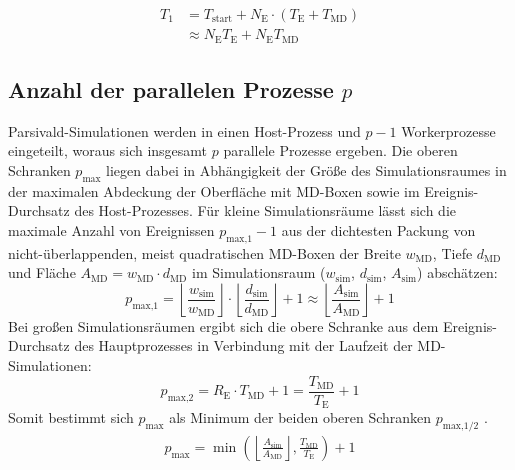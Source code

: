 \begin{align}
  T_1 & = T_\text{start} + N_\text{E} \cdot (T_\text{E} + T_\text{MD}) \\
      & \approx N_\text{E} T_\text{E} + N_\text{E} T_\text{MD}
\end{align}

\subsection{Anzahl der parallelen Prozesse \texorpdfstring{$p$}{p}}

Parsivald-Simulationen werden in einen Host-Prozess und $p-1$ Workerprozesse eingeteilt, woraus sich insgesamt $p$ parallele Prozesse ergeben.
Die oberen Schranken $p_\text{max}$ liegen dabei in Abhängigkeit der Größe des Simulationsraumes in der maximalen Abdeckung der Oberfläche mit MD-Boxen sowie im Ereignis-Durchsatz des Host-Prozesses.
Für kleine Simulationsräume lässt sich die maximale Anzahl von Ereignissen $p_\text{max,1}-1$ aus der dichtesten Packung von nicht-überlappenden, meist quadratischen MD-Boxen der Breite $w_\text{MD}$, Tiefe $d_\text{MD}$ und Fläche $A_\text{MD} = w_\text{MD} \cdot d_\text{MD}$ im Simulationsraum ($w_\text{sim}$, $d_\text{sim}$, $A_\text{sim}$) abschätzen:
\begin{equation}
  p_\text{max,1} = \left\lfloor\frac{w_\text{sim}}{w_\text{MD}}\right\rfloor \cdot \left\lfloor\frac{d_\text{sim}}{d_\text{MD}}\right\rfloor + 1 \approx \left\lfloor\frac{A_\text{sim}}{A_\text{MD}}\right\rfloor + 1
  \label{eq:pmax1}
\end{equation}
Bei großen Simulationsräumen ergibt sich die obere Schranke aus dem Ereignis-Durchsatz des Hauptprozesses in Verbindung mit der Laufzeit der MD-Simulationen:
\begin{equation}
  p_\text{max,2} = R_\text{E} \cdot T_\text{MD} + 1 = \frac{T_\text{MD}}{T_\text{E}} + 1
  \label{eq:pmax2}
\end{equation}
Somit bestimmt sich $p_\text{max}$ als Minimum der beiden oberen Schranken $p_\text{max,1/2}$ .
\begin{align}
  p_\text{max} = \min\left(\left\lfloor\frac{A_\text{sim}}{A_\text{MD}}\right\rfloor, \frac{T_\text{MD}}{T_\text{E}}\right) + 1
  \label{eq:pmax}
\end{align}

